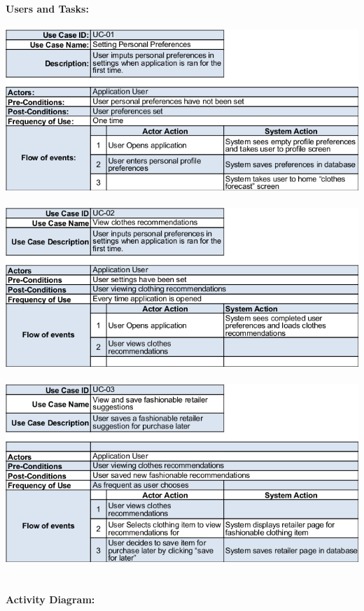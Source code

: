 \documentclass[12pt,a4paper]{article}
\begin{document}
\noindent\textbf{Users and Tasks:} \\\\
\includegraphics[scale=0.7]{usecase1.png} \\\\
\includegraphics[scale=0.7]{usecase2.png} \\\\
\includegraphics[scale=0.7]{usecase3.png} \\\\

\paragraph{Activity Diagram:}
\end{document}
